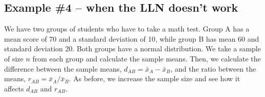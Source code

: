 \subsection{Example \#4 -- when the LLN doesn't work}
We have two groups of students who have to take a math test. Group A has a mean score of 70 and a standard deviation of 10, while group B has mean 60 and standard deviation 20. Both groups have a normal distribution.
We take a sample of size $n$ from each group and calculate the sample means. Then, we calculate the difference between the sample means, $d_{AB}=\bar{x}_A-\bar{x}_B$, and the ratio between the means, $r_{AB}=\bar{x}_A/\bar{x}_B$.
As before, we increase the sample size and see how it affects $d_{AB}$ and $r_{AB}$.

\begin{knitrout}
\color{fgcolor}\begin{kframe}
\begin{alltt}
 \hlkwb{<-} \hlstd{(}\hlstd{,}\hlstd{,}\hlstd{=}\hlstd{)}
\hlstd{(}\hlstd{)}
 \hlkwb{<-} \hlstd{(}\hlstd{,}
 \hlkwb{<-} \hlstd{(}\hlstd{,}
   \hlopt{:}
   \hlkwb{<-} \hlstd{,}\hlstd{)}
   \hlkwb{<-} \hlstd{,}\hlstd{)}
   \hlkwb{<-}  \hlopt{-} 
   \hlkwb{<-}  \hlopt{/} 
   \hlkwb{<-} 
   \hlkwb{<-} 
\hlstd{\}}
\hlstd{(}\hlstd{=}\hlstd{(}\hlstd{,}\hlstd{))}
\hlstd{=}\hlstd{,}\hlstd{=}\hlstd{,} \hlstd{=}\hlstd{,} \hlstd{=}\hlstd{,} \hlstd{=}\hlstd{)}
\hlstd{(}\hlstd{=}\hlstd{,}\hlstd{=}\hlstd{,}\hlstd{=}\hlstd{)}
\hlstd{=}\hlstd{,}\hlstd{=}\hlstd{,} \hlstd{=}\hlstd{,} \hlstd{=}\hlstd{,} \hlstd{=}\hlstd{)}
\hlstd{(}\hlstd{=}\hlopt{/}\hlstd{,}\hlstd{=}\hlstd{,}\hlstd{=}\hlstd{)}
\end{alltt}
\end{kframe}\begin{figure}


\end{figure}
\end{knitrout}
